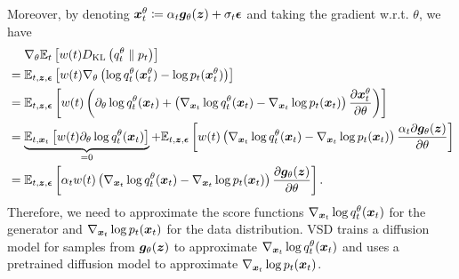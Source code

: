 Moreover, by denoting ${\bm{x}}_t^\theta \coloneqq \alpha_t{\bm{g}}_\theta({\bm{z}}) + \sigma_t \bm{\epsilon}$ and taking the gradient w.r.t. $\theta$, we have
\begin{equation*}
\begin{aligned}
    &\phantom{{}={}}\nabla_{\theta}\E_{t}\left[w(t) \kl{q_t^\theta}{p_t}\right]  \\
    &= \E_{t,\z,\vepsilon}\left[
        w(t) \nabla_\theta \left(\log q_t^{\theta}(\x_t^\theta) - \log p_t(\x_t^\theta)\right)
    \right] \\
    &= \E_{t,\z,\vepsilon}\left[
        w(t)\left( \partial_{\theta} \log q_t^{\theta}(\x_t)
        + \left(\nabla_{\x_t}\log q_t^{\theta}(\x_t) - \nabla_{\x_t}\log p_t(\x_t)\right)\frac{\partial \x_t^\theta}{\partial \theta}
    \right)
    \right] \\
    &= \underbrace{\mathbb{E}_{t,\x_t}\left[w(t) \partial_\theta \log q_t^\theta (\x_t)\right]}_{=0}
    + \E_{t,\z,\vepsilon}\left[w(t)
        \left(\nabla_{\x_t}\log q_t^{\theta}(\x_t) - \nabla_{\x_t}\log p_t(\x_t)\right)\frac{\alpha_t \partial \vg_\theta(\z)}{\partial \theta}
    \right] \\
    &= \E_{t,\z,\vepsilon}\left[\alpha_t w(t)
        \left(\nabla_{\x_t}\log q_t^{\theta}(\x_t) - \nabla_{\x_t}\log p_t(\x_t)\right)\frac{\partial \vg_\theta(\z)}{\partial \theta}
    \right].
\end{aligned}
\end{equation*}
Therefore, we need to approximate the score functions $\nabla_{{\bm{x}}_t}\log q_t^{\theta}({\bm{x}}_t)$ for the generator and $\nabla_{{\bm{x}}_t}\log p_t({\bm{x}}_t)$ for the data distribution. VSD trains a diffusion model for samples from ${\bm{g}}_\theta({\bm{z}})$ to approximate $\nabla_{{\bm{x}}_t}\log q_t^{\theta}({\bm{x}}_t)$ and uses a pretrained diffusion model to approximate $\nabla_{{\bm{x}}_t}\log p_t({\bm{x}}_t)$.

